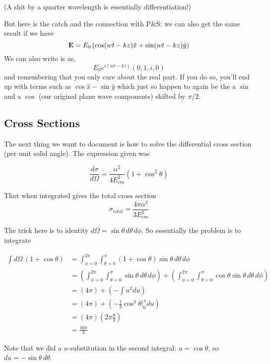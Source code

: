 (A shit by a quarter wavelength is essentially differentiation!)

But here is the catch and the connection with P\&S: we can also get the same result if we have
$$
\boldsymbol{\mathbf{E}} = E_0 \left( \cos(wt-kz)\hat{x} + \sin(wt-kz)\hat{y} \right)
$$
We can also write is as,
$$
E_0 e^{i(wt - kz)} (0, 1, i, 0)
$$
and remembering that you only care about the real part.
If you do so, you'll end up with terms such as $\cos \hat{x} - \sin \hat{y}$ which just so happen to again be the
a $\sin$ and a $\cos$ (our original plane wave components) shifted by $\pi/2$.




\subsection{Cross Sections}

The next thing we want to document is how to solve the differential cross section (per unit solid angle).
The expression given was

$$
\frac{d\sigma}{d\Omega} = \frac{\alpha^2}{4E_{cm}^{2}} (1 + \cos^2 \theta)
$$

That when integrated gives the total cross section
$$
\sigma_{total} = \frac{4\pi\alpha^2}{3E_{cm}^{2}}
$$

The trick here is to identity $d\Omega = \sin\theta \, d\theta \, d\phi$.
So essentially the problem is to integrate

\begin{align*}
\int d\Omega \, \left( 1 + \cos\theta \right) &=
    \int_{\phi=0}^{2\pi} \int_{\theta=0}^{\pi} \left( 1 + \cos\theta \right) \sin\theta \, d\theta \, d\phi \\
&= \left( \int_{\phi=0}^{2\pi} \int_{\theta=0}^{\pi} \sin\theta \, d\theta \, d\phi \right)
    + \left( \int_{\phi=0}^{2\pi} \int_{\theta=0}^{\pi} \cos\theta \sin\theta \, d\theta \, d\phi \right) \\
&= \left( 4\pi \right) + \left( -\int u^2 du \right) \\
&= \left( 4\pi \right) + \left( -\frac{1}{3} \cos^3 \theta \Big|_{0}^{\pi} du \right) \\
&= \left( 4\pi \right) \left( 2\pi \frac{8}{3} \right) \\
&= \frac{16\pi}{3}
\end{align*}

Note that we did a $u$-substitution in the second integral: $u = \cos\theta$, so $du = -\sin\theta \, d\theta$.







